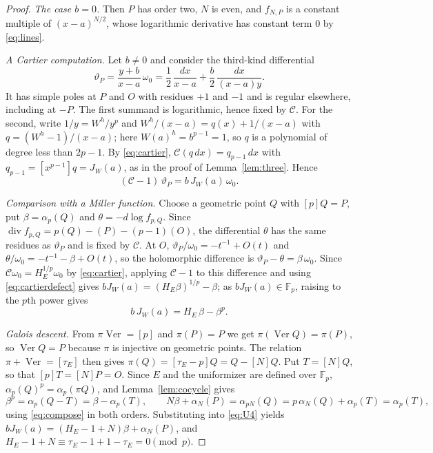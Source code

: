 \documentclass[11pt,a4paper]{article}
\numberwithin{equation}{section}
\theoremstyle{plain}
\theoremstyle{definition}
\DeclareMathOperator{\Ver}{Ver}
\DeclareMathOperator{\divisor}{div}
\newcommand{\F}{\mathbb{F}}
\newcommand{\C}{\mathcal{C}}
\begin{document}
\begin{proof}
\emph{The case $b=0$.} Then $P$ has order two, $N$ is even, and $f_{N,P}$ is a constant multiple of $(x-a)^{N/2}$, whose logarithmic derivative has constant term $0$ by \eqref{eq:lines}.

\emph{A Cartier computation.} Let $b\neq0$ and consider the third-kind differential
\[
\vartheta_P=\frac{y+b}{x-a}\,\omega_0=\frac12\,\frac{dx}{x-a}+\frac b2\,\frac{dx}{(x-a)y}.
\]
It has simple poles at $P$ and $O$ with residues $+1$ and $-1$ and is regular elsewhere, including at $-P$. The first summand is logarithmic, hence fixed by $\C$. For the second, write $1/y=W^h/y^p$ and $W^h/(x-a)=q(x)+1/(x-a)$ with $q=(W^h-1)/(x-a)$; here $W(a)^h=b^{p-1}=1$, so $q$ is a polynomial of degree less than $2p-1$. By \eqref{eq:cartier}, $\C(q\,dx)=q_{p-1}\,dx$ with $q_{p-1}=[x^{p-1}]q=J_W(a)$, as in the proof of Lemma~\ref{lem:three}. Hence
\begin{equation}\label{eq:cartierdefect}
(\C-1)\,\vartheta_P=b\,J_W(a)\,\omega_0 .
\end{equation}

\emph{Comparison with a Miller function.} Choose a geometric point $Q$ with $[p]Q=P$, put $\beta=\alpha_p(Q)$ and $\theta=-d\log f_{p,Q}$. Since $\divisor f_{p,Q}=p(Q)-(P)-(p-1)(O)$, the differential $\theta$ has the same residues as $\vartheta_P$ and is fixed by $\C$. At $O$, $\vartheta_P/\omega_0=-t^{-1}+O(t)$ and $\theta/\omega_0=-t^{-1}-\beta+O(t)$, so the holomorphic difference is $\vartheta_P-\theta=\beta\,\omega_0$. Since $\C\omega_0=H_E^{1/p}\omega_0$ by \eqref{eq:cartier}, applying $\C-1$ to this difference and using \eqref{eq:cartierdefect} gives $bJ_W(a)=(H_E\beta)^{1/p}-\beta$; as $bJ_W(a)\in\F_p$, raising to the $p$th power gives
\begin{equation}\label{eq:U4}
b\,J_W(a)=H_E\,\beta-\beta^p .
\end{equation}

\emph{Galois descent.} From $\pi\Ver=[p]$ and $\pi(P)=P$ we get $\pi(\Ver Q)=\pi(P)$, so $\Ver Q=P$ because $\pi$ is injective on geometric points. The relation $\pi+\Ver=[\tau_E]$ then gives $\pi(Q)=[\tau_E-p]Q=Q-[N]Q$. Put $T=[N]Q$, so that $[p]T=[N]P=O$. Since $E$ and the uniformizer are defined over $\F_p$, $\alpha_p(Q)^p=\alpha_p(\pi Q)$, and Lemma~\ref{lem:cocycle} gives
\[
\beta^p=\alpha_p(Q-T)=\beta-\alpha_p(T),\qquad
N\beta+\alpha_N(P)=\alpha_{pN}(Q)=p\,\alpha_N(Q)+\alpha_p(T)=\alpha_p(T),
\]
using \eqref{eq:compose} in both orders. Substituting into \eqref{eq:U4} yields $bJ_W(a)=(H_E-1+N)\beta+\alpha_N(P)$, and $H_E-1+N\equiv\tau_E-1+1-\tau_E=0\pmod p$.
\end{proof}
\end{document}

